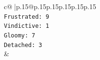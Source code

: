\documentclass{article}
\begin{document}
{\begin{supertabular}{c@{$\;$}|p{.15\linewidth}@{}p{.15\linewidth}p{.15\linewidth}p{.15\linewidth}p{.15\linewidth}p{.15\linewidth}}
{{{\\ 
\texttt{Frustrated: 9} \\
\texttt{Vindictive: 1} \\
\texttt{Gloomy: 7} \\
\texttt{Detached: 3} \\
            }
        }
    }
    & \\ \\

\end{supertabular}
}
\end{document}
